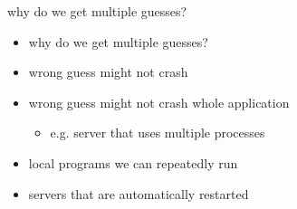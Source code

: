 \begin{frame}{why do we get multiple guesses?}
    \begin{itemize}
    \item why do we get multiple guesses?
    \vspace{.5cm}
    \item wrong guess might not crash
    \item wrong guess might not crash whole application
        \begin{itemize}
        \item e.g. server that uses multiple processes
        \end{itemize}
    \item local programs we can repeatedly run
    \item servers that are automatically restarted
    \end{itemize}
\end{frame}
